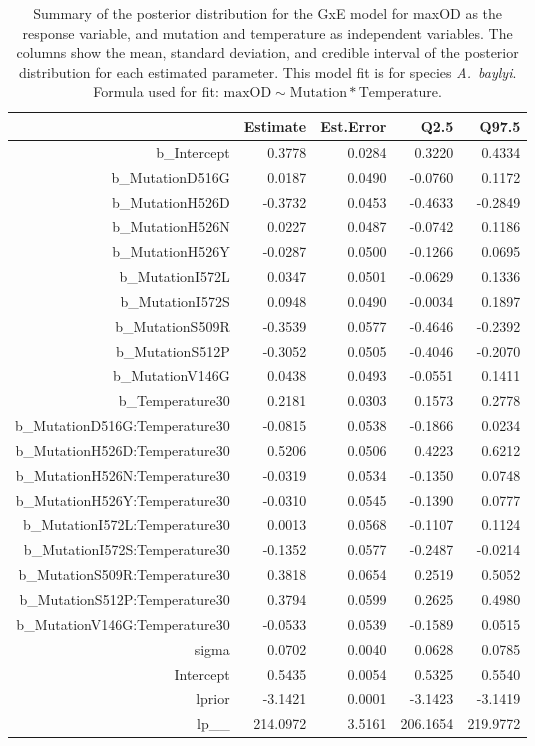 \begin{table}[ht]
\centering
\begin{tabular}{rrrrr}
  \hline
 & Estimate & Est.Error & Q2.5 & Q97.5 \\ 
  \hline
b\_Intercept & 0.3778 & 0.0284 & 0.3220 & 0.4334 \\ 
  b\_MutationD516G & 0.0187 & 0.0490 & -0.0760 & 0.1172 \\ 
  b\_MutationH526D & -0.3732 & 0.0453 & -0.4633 & -0.2849 \\ 
  b\_MutationH526N & 0.0227 & 0.0487 & -0.0742 & 0.1186 \\ 
  b\_MutationH526Y & -0.0287 & 0.0500 & -0.1266 & 0.0695 \\ 
  b\_MutationI572L & 0.0347 & 0.0501 & -0.0629 & 0.1336 \\ 
  b\_MutationI572S & 0.0948 & 0.0490 & -0.0034 & 0.1897 \\ 
  b\_MutationS509R & -0.3539 & 0.0577 & -0.4646 & -0.2392 \\ 
  b\_MutationS512P & -0.3052 & 0.0505 & -0.4046 & -0.2070 \\ 
  b\_MutationV146G & 0.0438 & 0.0493 & -0.0551 & 0.1411 \\ 
  b\_Temperature30 & 0.2181 & 0.0303 & 0.1573 & 0.2778 \\ 
  b\_MutationD516G:Temperature30 & -0.0815 & 0.0538 & -0.1866 & 0.0234 \\ 
  b\_MutationH526D:Temperature30 & 0.5206 & 0.0506 & 0.4223 & 0.6212 \\ 
  b\_MutationH526N:Temperature30 & -0.0319 & 0.0534 & -0.1350 & 0.0748 \\ 
  b\_MutationH526Y:Temperature30 & -0.0310 & 0.0545 & -0.1390 & 0.0777 \\ 
  b\_MutationI572L:Temperature30 & 0.0013 & 0.0568 & -0.1107 & 0.1124 \\ 
  b\_MutationI572S:Temperature30 & -0.1352 & 0.0577 & -0.2487 & -0.0214 \\ 
  b\_MutationS509R:Temperature30 & 0.3818 & 0.0654 & 0.2519 & 0.5052 \\ 
  b\_MutationS512P:Temperature30 & 0.3794 & 0.0599 & 0.2625 & 0.4980 \\ 
  b\_MutationV146G:Temperature30 & -0.0533 & 0.0539 & -0.1589 & 0.0515 \\ 
  sigma & 0.0702 & 0.0040 & 0.0628 & 0.0785 \\ 
  Intercept & 0.5435 & 0.0054 & 0.5325 & 0.5540 \\ 
  lprior & -3.1421 & 0.0001 & -3.1423 & -3.1419 \\ 
  lp\_\_ & 214.0972 & 3.5161 & 206.1654 & 219.9772 \\ 
   \hline
\end{tabular}
\caption{Summary of the posterior distribution for the GxE model for maxOD as the response variable, and mutation and temperature as independent variables. The columns show the mean, standard deviation, and credible interval of the posterior distribution for each estimated parameter. This model fit is for species \textit{A.~baylyi}.  Formula used for fit: $\text{maxOD} \sim \text{Mutation} * \text{Temperature}$.} 
\label{supptab:GxE_maxOD_Abaylyi}
\end{table}



